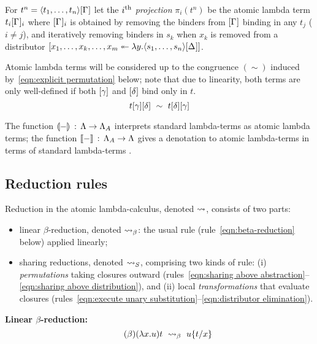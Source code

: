 \documentclass[orivec]{llncs}
\begin{document}
For $t^n=\tup t\G$ let the \emph{$i^{\mbox{\scriptsize th}}$ projection} $\pi_i(t^n)$ be the atomic lambda term $t_i\G_i$ where $\G_i$ is obtained by removing the binders from $\G$ binding in any $t_j$ ($i\neq j$), and iteratively removing binders in $s_k$ when $x_k$ is removed from a distributor $\distr*{x_1,\dots,x_k,\dots,x_m}y{\tup s\G*}$.



Atomic lambda terms will be considered up to the congruence $(\sim)$ induced by~\eqref{eqn:explicit permutation} below;
note that due to linearity, both terms are only well-defined if both $\g$ and $\g*$ bind only in $t$.
%
\begin{equation}\label{eqn:explicit permutation}
	t\g\g* ~\sim~ t\g*\g
\end{equation}




The function ${\llparenthesis{-}\rrparenthesis_{{}}}\,:\,\Lambda\to\Lambda_A$ interprets standard lambda-terms as atomic lambda terms; the function ${\llbracket{-}\rrbracket}\,:\,\Lambda_A\to\Lambda$ gives a denotation to atomic lambda-terms in terms of standard lambda-terms \cite{Gundersen-Heijltjes-Parigot-2013-LICS}.


\subsection{Reduction rules}


Reduction in the atomic lambda-calculus, denoted $\rewrite$, consists of two parts:
\begin{itemize}
 \item linear $\beta$-reduction, denoted $\ALbeta$: the usual rule (rule~\ref{eqn:beta-reduction} below) applied linearly;
 \item sharing reductions, denoted $\ALnotbeta$, comprising two kinds of rule: (i) \emph{permutations} taking closures outward (rules~\ref{eqn:sharing above abstraction}--\ref{eqn:sharing above distribution}), and (ii) local \emph{transformations} that evaluate closures (rules~\ref{eqn:execute unary substitution}--\ref{eqn:distributor elimination}).
\end{itemize}


\noindent
{\bf Linear  $\beta$-reduction:}
%
\begin{equation}\tag{$\beta$}\label{eqn:beta-reduction}
	(\lambda x.u)t ~\ALbeta~ u\sub xt
\end{equation}
\end{document}
